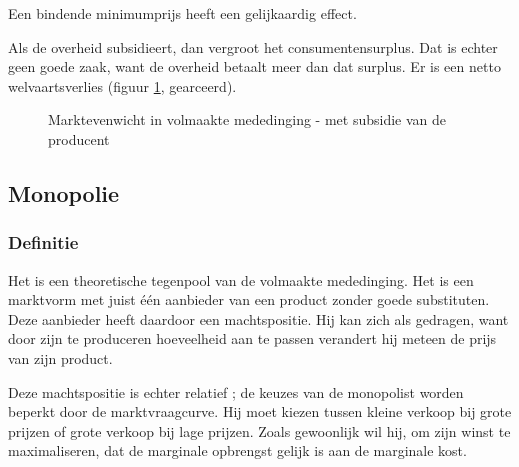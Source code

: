 Een bindende minimumprijs heeft een gelijkaardig effect. \\

\par Als de overheid subsidieert, dan vergroot het consumentensurplus. Dat is echter geen goede zaak, want de overheid betaalt meer dan dat surplus. Er is een netto welvaartsverlies (figuur \ref{fig:h3vmews}, gearceerd).

\begin{figure}[H]
\vspace{0.5cm}
\centering
\captionsetup{justification=centering,margin=2cm}
\caption{Marktevenwicht in volmaakte mededinging - met subsidie van de producent}
\label{fig:h3vmews}
\end{figure}

\subsection{Monopolie}

\subsubsection{Definitie}

Het  is een theoretische tegenpool van de volmaakte mededinging. Het is een marktvorm met juist \'e\'en aanbieder van een  product zonder goede substituten. Deze aanbieder heeft daardoor een machtspositie. Hij kan zich als  gedragen, want door zijn te produceren hoeveelheid aan te passen verandert hij meteen de prijs van zijn product.
\par Deze machtspositie is echter relatief ; de keuzes van de monopolist worden beperkt door de marktvraagcurve. Hij moet kiezen tussen kleine verkoop bij grote prijzen of grote verkoop bij lage prijzen. Zoals gewoonlijk wil hij, om zijn winst te maximaliseren, dat de marginale opbrengst gelijk is aan de marginale kost.\\

